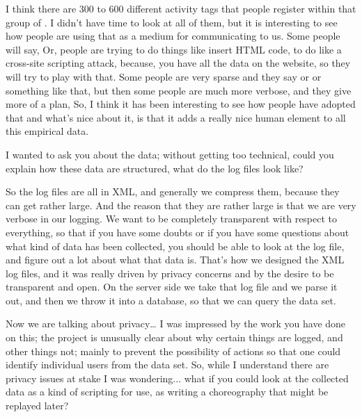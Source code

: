 { I think there are 300 to 600 different activity tags that people
register within that group of . I didn't have time to look at all of them, but
it is interesting to see how people are using that as a medium for
communicating to us. Some people will say,  Or, people are trying to do things like insert HTML code, to do
like a cross{}-site scripting attack, because, you have all the data on
the website, so they will try to play with that. Some people are very
sparse and they say  or  or something like that, but then some people
are much more verbose, and they give more of a plan,  So, I think it has been interesting to see how
people have adopted that and what's nice about it, is that it adds a
really nice human element to all this empirical data.\par

 I wanted to ask you about the data; without
getting too technical, could you explain how these data are structured,
what do the log files look like?\par

 So the log files are all in XML, and generally we compress them,
because they can get rather large. And the reason that they are rather
large is that we are very verbose in our logging. We want to be
completely transparent with respect to everything, so that if you have
some doubts or if you have some questions about what kind of data has
been collected, you should be able to look at the log file, and figure
out a lot about what that data is. That's how we designed the XML log
files, and it was really driven by privacy concerns and by the desire
to be transparent and open. On the server side we take that log file
and we parse it out, and then we throw it into a database, so that we
can query the data set.\par

 Now we are talking about privacy{\dots} I was impressed by the
work you have done on this; the project is unusually clear about why
certain things are logged, and other things not; mainly to prevent the
possibility of  actions
so that one could identify individual users from the data set. So,
while I understand there are privacy issues at stake I was wondering...
what if you could look at the collected data as a kind of scripting for
use, as writing a choreography that might be replayed later?\par

}

